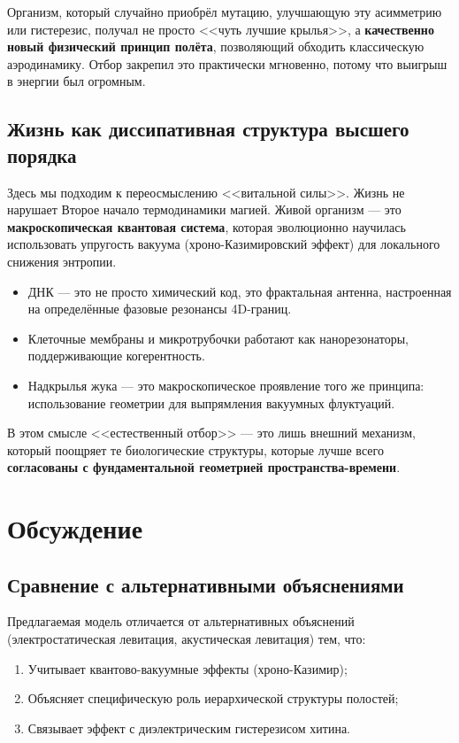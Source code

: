 \documentclass[12pt,a4paper]{article}
\begin{document}
Организм, который случайно приобрёл мутацию, улучшающую эту асимметрию или гистерезис, получал не просто <<чуть лучшие крылья>>, а \textbf{качественно новый физический принцип полёта}, позволяющий обходить классическую аэродинамику. Отбор закрепил это практически мгновенно, потому что выигрыш в энергии был огромным.

\subsection{Жизнь как диссипативная структура высшего порядка}

Здесь мы подходим к переосмыслению <<витальной силы>>. Жизнь не нарушает Второе начало термодинамики магией. Живой организм --- это \textbf{макроскопическая квантовая система}, которая эволюционно научилась использовать упругость вакуума (хроно-Казимировский эффект) для локального снижения энтропии.

\begin{itemize}
    \item ДНК --- это не просто химический код, это фрактальная антенна, настроенная на определённые фазовые резонансы 4D-границ.
    \item Клеточные мембраны и микротрубочки работают как нанорезонаторы, поддерживающие когерентность.
    \item Надкрылья жука --- это макроскопическое проявление того же принципа: использование геометрии для выпрямления вакуумных флуктуаций.
\end{itemize}

В этом смысле <<естественный отбор>> --- это лишь внешний механизм, который поощряет те биологические структуры, которые лучше всего \textbf{согласованы с фундаментальной геометрией пространства-времени}.

\section{Обсуждение}

\subsection{Сравнение с альтернативными объяснениями}

Предлагаемая модель отличается от альтернативных объяснений (электростатическая левитация, акустическая левитация) тем, что:
\begin{enumerate}
    \item Учитывает квантово-вакуумные эффекты (хроно-Казимир);
    \item Объясняет специфическую роль иерархической структуры полостей;
    \item Связывает эффект с диэлектрическим гистерезисом хитина.
\end{enumerate}
\end{document}

